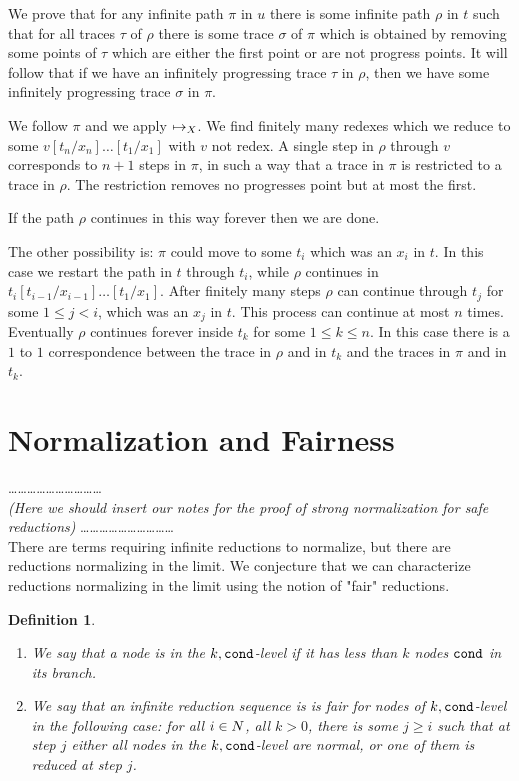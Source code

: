 \documentclass{article}
\newtheorem{definition}[theorem]{Definition}
\newenvironment{proof}[1][Proof]{\begin{trivlist}
\item[\hskip \labelsep {\bfseries #1}]}{\end{trivlist}}
\begin{document}
\begin{proof}
We prove that for any infinite path $\pi$ in $u$ there is some infinite path $\rho$ in $t$ such that
for all traces $\tau$ of $\rho$ there is some trace $\sigma$ of $\pi$ which is obtained by
removing some points of $\tau$ which are either the first point or are not progress points. 
It will follow that if we have an infinitely progressing trace $\tau$ in $\rho$, then we have some infinitely
progressing trace $\sigma$ in $\pi$.

We follow $\pi$ and we apply ${\mapsto}_X$. We find finitely many redexes which we reduce to
some $v[t_n/x_n]\ldots[t_1/x_1]$ with $v$ not redex. A single step in $\rho$ through $v$
corresponds to $n+1$ steps in $\pi$, in such a way that a trace in $\pi$ is restricted to a trace
in $\rho$. The restriction removes no progresses point but at most the first. 

If the path $\rho$ continues in this way forever then we are done.

The other possibility is: $\pi$ could move to some $t_i$ which was an $x_i$ in $t$. In this case we restart
the path in $t$ through $t_i$, while $\rho$ continues in $t_i[t_{i-1}/x_{i-1}]\ldots[t_1/x_1]$.
After finitely many steps $\rho$ can continue through $t_j$ for some $1 \le j < i$, which was an $x_j$
in $t$. This process can continue at most $n$ times. 
Eventually $\rho$ continues forever inside $t_k$ for some $1 \le k \le n$. In this case there is a $1$ to $1$
correspondence between the trace in $\rho$ and in $t_k$ and the traces in $\pi$ and in $t_k$.
\end{proof}


\section{Normalization and Fairness}


\ldots\ldots\ldots\ldots\ldots\ldots\ldots\ldots\ldots\ldots
\\
\emph{(Here we should insert our notes for the proof of strong normalization for safe reductions)}
\ldots\ldots\ldots\ldots\ldots\ldots\ldots\ldots\ldots\ldots
\\

There are terms requiring infinite reductions to normalize, but there are reductions normalizing in the limit.
We conjecture that we can characterize reductions normalizing in the limit using the notion of "fair" reductions.

\begin{definition}
\begin{enumerate}
\item
We say that a node is in the $k,{\tt cond}$-level if it has less than $k$ nodes ${\tt cond}$ in its branch.
\item
We say that an infinite reduction sequence is is \emph{fair} for nodes of $k,{\tt cond}$-level in the following case:
for all $i\in {N}$, all $k>0$, there is some  $j \ge i$ such that at step $j$ either all nodes in the 
$k,{\tt cond}$-level are normal, or one of them is reduced at step $j$.
\end{enumerate}
\end{definition}
\end{document}
